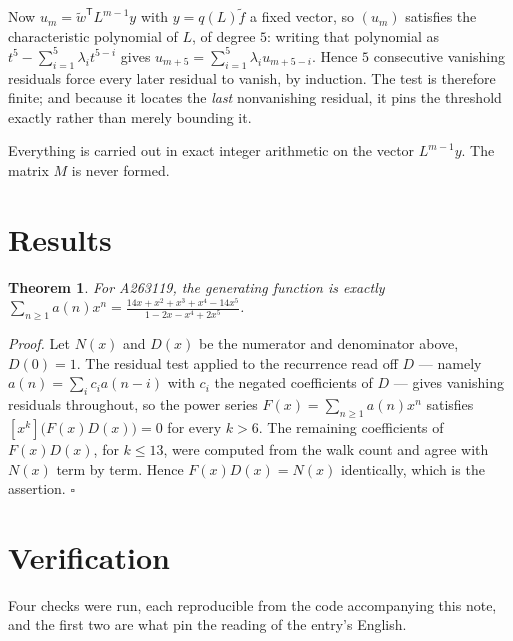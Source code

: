 \documentclass[11pt]{article}
\newtheorem{theorem}{Theorem}
\theoremstyle{definition}
\begin{document}
Now $u_m = \tilde w^{\mathsf T} L^{m-1} y$ with $y = q(L)\tilde f$ a fixed vector, so $(u_m)$ satisfies the characteristic polynomial of $L$, of degree $5$: writing that polynomial as $t^{5} - \sum_{i=1}^{5} \lambda_i t^{5-i}$ gives $u_{m+5} = \sum_{i=1}^{5} \lambda_i u_{m+5-i}$. Hence $5$ consecutive vanishing residuals force every later residual to vanish, by induction. The test is therefore finite; and because it locates the {\itshape last} nonvanishing residual, it pins the threshold exactly rather than merely bounding it.

Everything is carried out in exact integer arithmetic on the vector $L^{m-1}y$. The matrix $M$ is never formed.

\section{Results}

\begin{theorem} For A263119, the generating function is exactly $\sum_{n\ge 1} a(n)x^n = \frac{14x + x^{2} + x^{3} + x^{4} - 14x^{5}}{1 - 2x - x^{4} + 2x^{5}}$.\end{theorem}

{\itshape Proof.} Let $N(x)$ and $D(x)$ be the numerator and denominator above, $D(0)=1$. The residual test applied to the recurrence read off $D$ --- namely $a(n) = \sum_i c_i a(n-i)$ with $c_i$ the negated coefficients of $D$ --- gives vanishing residuals throughout, so the power series $F(x)=\sum_{n\ge 1}a(n)x^n$ satisfies $[x^k]\bigl(F(x)D(x)\bigr) = 0$ for every $k > 6$. The remaining coefficients of $F(x)D(x)$, for $k \le 13$, were computed from the walk count and agree with $N(x)$ term by term. Hence $F(x)D(x) = N(x)$ identically, which is the assertion. $\square$

\section{Verification}

Four checks were run, each reproducible from the code accompanying this note, and the first two are what pin the reading of the entry's English.
\end{document}

